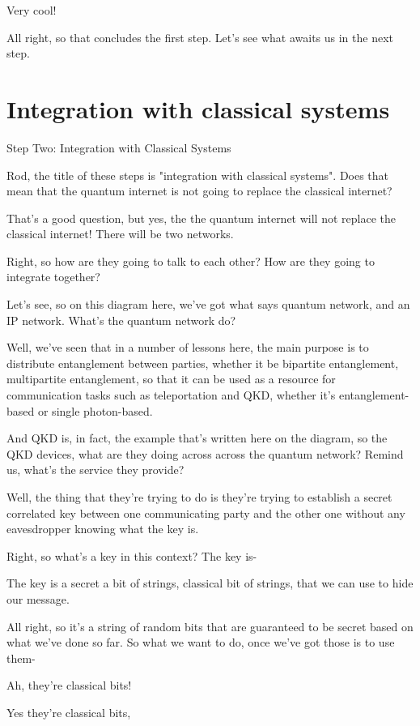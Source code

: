 Very cool!

All right, so that concludes the first step. Let's see what awaits us in the next step.

\section{Integration with classical systems}
\label{sec:classical-integration}

Step Two: Integration with Classical Systems

Rod, the title of these steps is "integration with classical systems". Does that mean that the quantum internet is not going to replace the classical internet?

That's a good question, but yes, the the quantum internet will not replace the classical internet! There will be two networks.

Right, so how are they going to talk to each other? How are they going to integrate together?

Let's see, so on this diagram here, we've got what says quantum network, and an IP network. What's the quantum network do?

Well, we've seen that in a number of lessons here, the main purpose is to distribute entanglement between parties, whether it be bipartite entanglement, multipartite entanglement, so that it can be used as a resource for communication tasks such as teleportation and QKD, whether it's entanglement-based or single photon-based.

And QKD is, in fact, the example that's written here on the diagram, so the QKD devices, what are they doing across across the quantum network? Remind us, what's the service they provide?

Well, the thing that they're trying to do is they're trying to establish a secret correlated key between one communicating party and the other one without any eavesdropper knowing what the key is.

Right, so what's a key in this context? The key is-

The key is a secret a bit of strings, classical bit of strings, that we can use to hide our message.

All right, so it's a string of random bits that are guaranteed to be secret based on what we've done so far. So what we want to do, once we've got those is to use them-

Ah, they're classical bits!

Yes they're classical bits,

